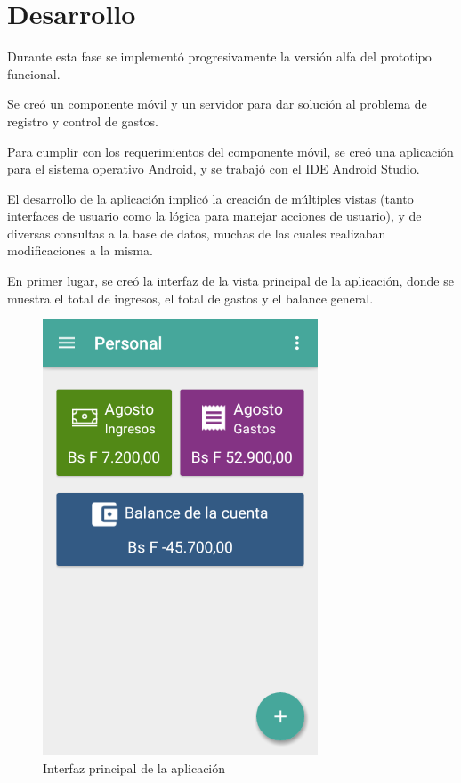 \section{Desarrollo} \label{sect:desarrollo}

Durante esta fase se implementó progresivamente la versión alfa del prototipo funcional. 

Se creó un componente móvil y un servidor para dar solución al problema de registro y control de gastos.

Para cumplir con los requerimientos del componente móvil, se creó una aplicación para el sistema operativo Android, y se trabajó con el IDE Android Studio.

 El desarrollo de la aplicación implicó la creación de múltiples vistas (tanto interfaces de usuario como la lógica para manejar acciones de usuario), y de diversas consultas a la base de datos, muchas de las cuales realizaban modificaciones a la misma.

En primer lugar, se creó la interfaz de la vista principal de la aplicación, donde se muestra el total de ingresos, el total de gastos y el balance general.

\begin{figure}[ht]
  \centering
  \includegraphics[scale=0.45,type=png,ext=.png,read=.png]{imagenes/dashboard}
  \caption{Interfaz principal de la aplicación}
  \label{fig:interfazDashboard}
\end{figure}

